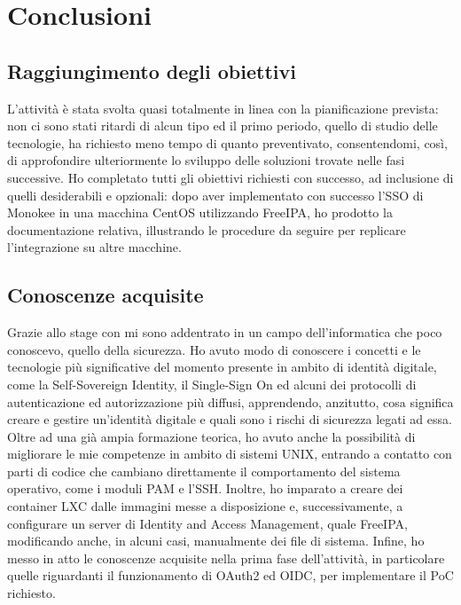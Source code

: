 
\chapter{Conclusioni}
\label{cap:conclusioni}

\section{Raggiungimento degli obiettivi}

L'attività è stata svolta quasi totalmente in linea con la pianificazione prevista: non ci sono stati ritardi di alcun tipo ed il primo periodo, quello di studio delle tecnologie, ha richiesto meno tempo di quanto preventivato, consentendomi, così, di approfondire ulteriormente lo sviluppo delle soluzioni trovate nelle fasi successive.
Ho completato tutti gli obiettivi richiesti con successo, ad inclusione di quelli desiderabili e opzionali: dopo aver implementato con successo l'SSO di Monokee in una macchina CentOS utilizzando FreeIPA, ho prodotto la documentazione relativa, illustrando le procedure da seguire per replicare l'integrazione su altre macchine.

\section{Conoscenze acquisite}

Grazie allo stage con \myAzienda mi sono addentrato in un campo dell'informatica che poco conoscevo, quello della sicurezza. Ho avuto modo di conoscere i concetti e le tecnologie più significative del momento presente in ambito di identità digitale, come la Self-Sovereign Identity, il Single-Sign On ed alcuni dei protocolli di autenticazione ed autorizzazione più diffusi, apprendendo, anzitutto, cosa significa creare e gestire un'identità digitale e quali sono i rischi di sicurezza legati ad essa. Oltre ad una già ampia formazione teorica, ho avuto anche la possibilità di migliorare le mie competenze in ambito di sistemi UNIX, entrando a contatto con parti di codice che cambiano direttamente il comportamento del sistema operativo, come i moduli PAM e l'SSH.
Inoltre, ho imparato a creare dei container LXC dalle immagini messe a disposizione e, successivamente, a configurare un server di Identity and Access Management, quale FreeIPA, modificando anche, in alcuni casi, manualmente dei file di sistema.
Infine, ho messo in atto le conoscenze acquisite nella prima fase dell'attività, in particolare quelle riguardanti il funzionamento di OAuth2 ed OIDC, per implementare il PoC richiesto. 

